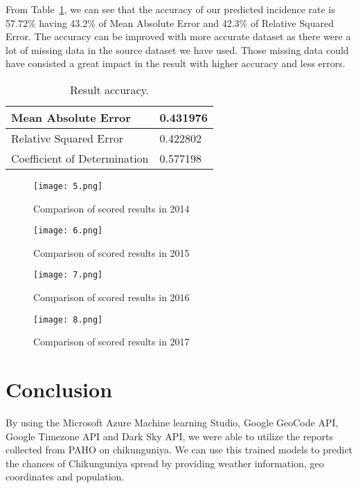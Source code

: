 \documentclass[conference]{IEEEtran}
\begin{document}
From Table~\ref{tab:table1}, we can see that the accuracy of our predicted incidence rate is 57.72\% having 43.2\% of Mean Absolute Error and 42.3\% of Relative Squared Error. The accuracy can be improved with more accurate dataset as there were a lot of missing data in the source dataset we have used. Those missing data could have consisted a great impact in the result with higher accuracy and less errors.

\begin{table}[h!]
  \begin{center}
    \caption{Result accuracy.}
    \label{tab:table1}
\begin{tabular}{|l|l|}
\hline
Mean Absolute Error          & 0.431976 \\ \hline
Relative Squared Error       & 0.422802 \\ \hline
Coefficient of Determination & 0.577198 \\ \hline
\end{tabular}
  \end{center}
\end{table}


\begin{figure}[ht!] %
 \centering
 \texttt{[image: 5.png]}
 \caption{Comparison of scored results in 2014 }
 \label{compare_score_2014}
 \end{figure}

\begin{figure}[ht!] %
 \centering
 \texttt{[image: 6.png]}
 \caption{Comparison of scored results in 2015 }
 \label{compare_score_2015}
 \end{figure}

\begin{figure}[ht!] %
 \centering
 \texttt{[image: 7.png]}
 \caption{Comparison of scored results in 2016}
 \label{compare_score_2016}
 \end{figure}

\begin{figure}[ht!] %
 \centering
 \texttt{[image: 8.png]}
 \caption{Comparison of scored results in 2017}
 \label{compare_score_2017}
 \end{figure}


\clearpage
\thispagestyle{empty}
\section{Conclusion}

By using the Microsoft Azure Machine learning Studio, Google GeoCode API, Google Timezone API and Dark Sky API, we were able to utilize the reports collected from PAHO on chikunguniya. We can use this trained models to predict the chances of Chikunguniya spread by providing weather information, geo coordinates and population.
\end{document}

